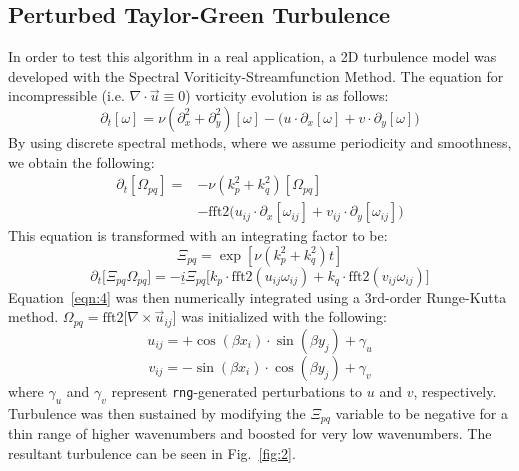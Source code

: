 \documentclass[10pt, reqno]{amsart}
\begin{document}
\begin{multicols}{2}
\section{Perturbed Taylor-Green Turbulence}
In order to test this algorithm in a real application, a 2D turbulence model was developed with the Spectral Voriticity-Streamfunction Method. The equation for incompressible (i.e. $\nabla \cdot \vec{u} \equiv 0$) vorticity evolution is as follows:
\begin{equation}\label{eqn:1}
    \partial_t \left[ \omega \right] = \nu \left( \partial_x^2 + \partial_y^2 \right) \left[ \omega \right] - \Big( u \cdot \partial_x \left[ \omega \right] + v \cdot \partial_y \left[ \omega \right] \Big)  
\end{equation}
By using discrete spectral methods, where we assume periodicity and smoothness, we obtain the following:
\begin{equation}\label{eqn:2}
    \begin{aligned}
    \partial_t \left[ \Omega_{pq} \right] = & - \nu \left( k_p^2 + k_q^2 \right) \left[ \Omega_{pq} \right] \\
    & - \mathrm{fft2} \Big( u_{ij} \cdot \partial_x \left[ \omega_{ij} \right] + v_{ij} \cdot \partial_y \left[ \omega_{ij} \right] \Big) 
    \end{aligned}
\end{equation}
This equation is transformed with an integrating factor to be:
\begin{equation}\label{eqn:3}
    \Xi_{pq} = \exp \left[ \nu \left(k_p^2 + k_q^2 \right) t \right]
\end{equation}
\begin{equation}\label{eqn:4}
    \partial_t \Big[ \Xi_{pq} \Omega_{pq} \Big] = - \underline{i} \Xi_{pq} \Big[ k_p \cdot \mathrm{fft2}(u_{ij} \omega_{ij}) + k_q \cdot \mathrm{fft2}(v_{ij} \omega_{ij}) \Big]
\end{equation}
Equation~\eqref{eqn:4} was then numerically integrated using a 3rd-order Runge-Kutta method. $\Omega_{pq} = \mathrm{fft2} \Big[ \nabla \times \vec{u}_{ij} \Big]$ was initialized with the following:
\begin{equation}\label{eqn:5}
    u_{ij} = +\cos(\beta x_i) \cdot \sin(\beta y_j) + \gamma_u 
\end{equation}
\begin{equation}\label{eqn:6}
    v_{ij} = -\sin(\beta x_i) \cdot \cos(\beta y_j) + \gamma_v 
\end{equation}
where $\gamma_u$ and $\gamma_v$ represent \verb|rng|-generated perturbations to $u$ and $v$, respectively. Turbulence was then sustained by modifying the $\Xi_{pq}$ variable to be negative for a thin range of higher wavenumbers and boosted for very low wavenumbers. The resultant turbulence can be seen in Fig.~\ref{fig:2}.

\end{multicols}
\end{document}
